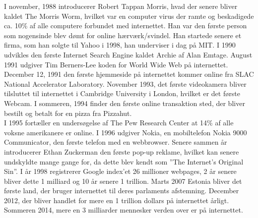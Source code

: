         I november, 1988 introducerer Robert Tappan Morris, hvad der senere bliver kaldet The Morris Worm, hvilket var en computer virus der ramte og beskadigede ca. 10\% af alle computere forbundet med internettet. Han var den første person som nogensinde blev dømt for online hærværk/svindel. Han startede senere et firma, som han solgte til Yahoo i 1998, han underviser i dag på MIT. I 1990 udvikles den første Internet Search Engine kaldet Archie af Alan Emtage. August 1991 udgiver Tim Berners-Lee koden for World Wide Web på internettet. December 12, 1991 den første hjemmeside på internettet kommer online fra SLAC National Accelerator Laboratory. November 1993, det første videokamera bliver tilsluttet til internettet i Cambridge University i London, hvilket er det første Webcam. I sommeren, 1994 finder den første online transaktion sted, der bliver bestilt og betalt for en pizza fra Pizzahut.\\
        I 1995 fortæller en undersøgelse af The Pew Research Center at 14\% af alle voksne amerikanere er online. I 1996 udgiver Nokia, en mobiltelefon Nokia 9000 Communicator, den første telefon med en webbrowser. Senere sammen år introducerer Ethan Zuckerman den første pop-up reklame, hvilket kan senere undskyldte mange gange for, da dette blev kendt som ”The Internet’s Original Sin”. I år 1998 registrerer Google index’et 26 millioner webpages, 2 år senere bliver dette 1 milliard og 10 år senere 1 trillion. Marts 2007 Estonia bliver det første land, der bruger internettet til deres parlaments afstemning. December 2012, der bliver handlet for mere en 1 trillion dollars på internettet årligt. Sommeren 2014, mere en 3 milliarder mennesker verden over er på internettet.\autocite{gilpress2015}\\

    
    
    
